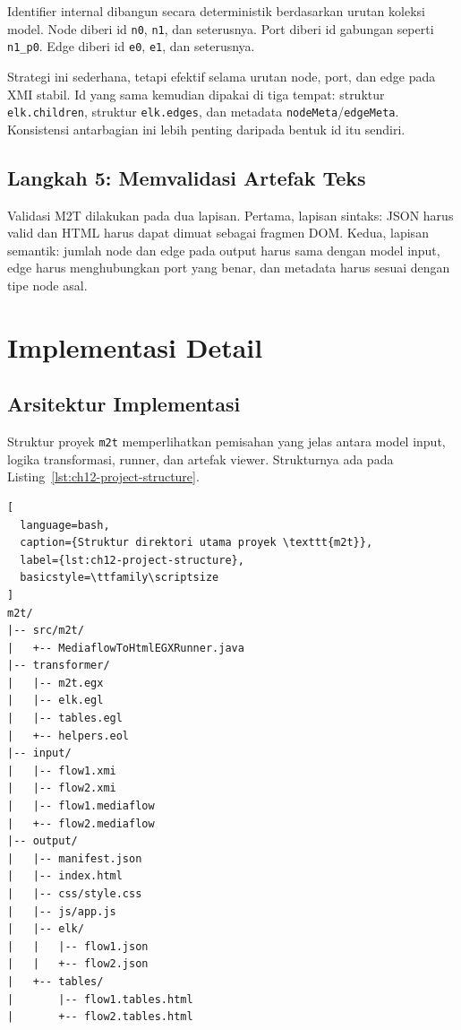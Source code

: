 Identifier internal dibangun secara deterministik berdasarkan urutan koleksi model. Node diberi id \texttt{n0}, \texttt{n1}, dan seterusnya. Port diberi id gabungan seperti \texttt{n1\_p0}. Edge diberi id \texttt{e0}, \texttt{e1}, dan seterusnya.

Strategi ini sederhana, tetapi efektif selama urutan node, port, dan edge pada XMI stabil. Id yang sama kemudian dipakai di tiga tempat: struktur \texttt{elk.children}, struktur \texttt{elk.edges}, dan metadata \texttt{nodeMeta}/\texttt{edgeMeta}. Konsistensi antarbagian ini lebih penting daripada bentuk id itu sendiri.

\subsection{Langkah 5: Memvalidasi Artefak Teks}

Validasi M2T dilakukan pada dua lapisan. Pertama, lapisan sintaks: JSON harus valid dan HTML harus dapat dimuat sebagai fragmen DOM. Kedua, lapisan semantik: jumlah node dan edge pada output harus sama dengan model input, edge harus menghubungkan port yang benar, dan metadata harus sesuai dengan tipe node asal.

\section{Implementasi Detail}

\subsection{Arsitektur Implementasi}

Struktur proyek \texttt{m2t} memperlihatkan pemisahan yang jelas antara model input, logika transformasi, runner, dan artefak viewer. Strukturnya ada pada Listing~\ref{lst:ch12-project-structure}.

\begin{lstlisting}[
  language=bash,
  caption={Struktur direktori utama proyek \texttt{m2t}},
  label={lst:ch12-project-structure},
  basicstyle=\ttfamily\scriptsize
]
m2t/
|-- src/m2t/
|   +-- MediaflowToHtmlEGXRunner.java
|-- transformer/
|   |-- m2t.egx
|   |-- elk.egl
|   |-- tables.egl
|   +-- helpers.eol
|-- input/
|   |-- flow1.xmi
|   |-- flow2.xmi
|   |-- flow1.mediaflow
|   +-- flow2.mediaflow
|-- output/
|   |-- manifest.json
|   |-- index.html
|   |-- css/style.css
|   |-- js/app.js
|   |-- elk/
|   |   |-- flow1.json
|   |   +-- flow2.json
|   +-- tables/
|       |-- flow1.tables.html
|       +-- flow2.tables.html
\end{lstlisting}

